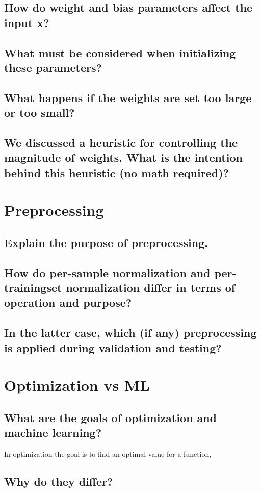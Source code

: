 \subsection{How do weight and bias parameters affect the input x?}
\subsection{What must be considered when initializing these parameters?}
\subsection{What happens if the weights are set too large or too small?}
\subsection{We discussed a heuristic for controlling the magnitude of weights. What is the intention behind this heuristic (no math required)?}

\section{Preprocessing}
\subsection{Explain the purpose of preprocessing.}
\subsection{How do per-sample normalization and per-trainingset normalization differ in terms of operation and purpose?}
\subsection{In the latter case, which (if any) preprocessing is applied during validation and testing?}

\section{Optimization vs ML}
\subsection{What are the goals of optimization and machine learning?}
In optimization the goal is to find an optimal value for a function, 
\subsection{Why do they differ?}
